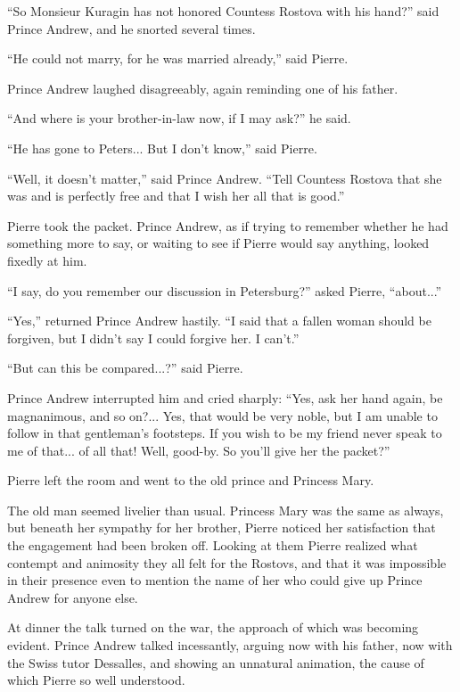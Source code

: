 ``So Monsieur Kuragin has not honored Countess Rostova with his
hand?''  said Prince Andrew, and he snorted several times.

``He could not marry, for he was married already,'' said Pierre.

Prince Andrew laughed disagreeably, again reminding one of his
father.

``And where is your brother-in-law now, if I may ask?'' he said.

``He has gone to Peters... But I don't know,'' said Pierre.

``Well, it doesn't matter,'' said Prince Andrew. ``Tell Countess
Rostova that she was and is perfectly free and that I wish her
all that is good.''

Pierre took the packet. Prince Andrew, as if trying to remember
whether he had something more to say, or waiting to see if Pierre
would say anything, looked fixedly at him.

``I say, do you remember our discussion in Petersburg?'' asked
Pierre, ``about...''

``Yes,'' returned Prince Andrew hastily. ``I said that a fallen
woman should be forgiven, but I didn't say I could forgive her. I
can't.''

``But can this be compared...?'' said Pierre.

Prince Andrew interrupted him and cried sharply: ``Yes, ask her
hand again, be magnanimous, and so on?... Yes, that would be very
noble, but I am unable to follow in that gentleman's
footsteps. If you wish to be my friend never speak to me of
that... of all that! Well, good-by. So you'll give her the
packet?''

Pierre left the room and went to the old prince and Princess
Mary.

The old man seemed livelier than usual. Princess Mary was the
same as always, but beneath her sympathy for her brother, Pierre
noticed her satisfaction that the engagement had been broken
off. Looking at them Pierre realized what contempt and animosity
they all felt for the Rostovs, and that it was impossible in
their presence even to mention the name of her who could give up
Prince Andrew for anyone else.

At dinner the talk turned on the war, the approach of which was
becoming evident. Prince Andrew talked incessantly, arguing now
with his father, now with the Swiss tutor Dessalles, and showing
an unnatural animation, the cause of which Pierre so well
understood.


